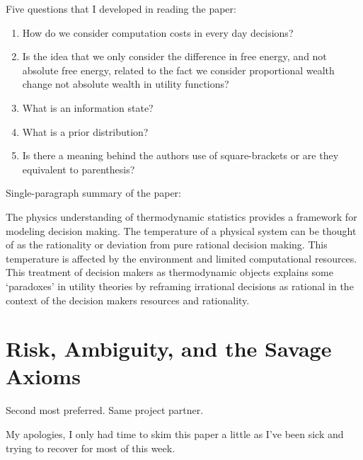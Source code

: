 \documentclass[a4paper, 12pt]{config/homework}
\begin{document}
\noindent
Five questions that I developed in reading the paper:
\begin{enumerate}
\item How do we consider computation costs in every day decisions?
\item Is the idea that we only consider the difference in free energy, and not absolute free energy, related to the fact we consider proportional wealth change not absolute wealth in utility functions?
\item What is an information state?
\item What is a prior distribution?
\item Is there a meaning behind the authors use of square-brackets or are they equivalent to parenthesis?
\end{enumerate}

\noindent
Single-paragraph summary of the paper:

The physics understanding of thermodynamic statistics provides a framework for modeling decision making. The temperature of a physical system can be thought of as the rationality or deviation from pure rational decision making. This temperature is affected by the environment and limited computational resources. This treatment of decision makers as thermodynamic objects explains some `paradoxes' in utility theories by reframing irrational decisions as rational in the context of the decision makers resources and rationality.

\section{Risk, Ambiguity, and the Savage Axioms}
Second most preferred. Same project partner.

My apologies, I only had time to skim this paper a little as I've been sick and trying to recover for most of this week.
\end{document}
